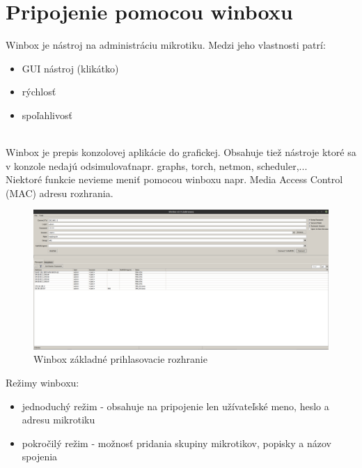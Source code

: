 \section{Pripojenie pomocou winboxu}
Winbox\cite{winbox} je nástroj na administráciu mikrotiku. Medzi jeho vlastnosti patrí:\begin{itemize}
\item GUI nástroj (klikátko)
\item rýchlosť
\item spoľahlivosť 
\end{itemize} 
\\Winbox je prepis konzolovej aplikácie do grafickej. Obsahuje tiež nástroje ktoré sa v konzole nedajú odsimulovaťnapr. graphs, torch, netmon, scheduler,...\\
Niektoré funkcie nevieme meniť pomocou winboxu napr. Media Access Control (MAC) adresu rozhrania. 
\begin{figure}[H]
\centering
\includegraphics[scale=0.2]{../text/winbox.png}
\caption{Winbox základné prihlasovacie rozhranie}
\label{fig:winbox}
\end{figure} 
Režimy winboxu:\begin{itemize}
\item jednoduchý režim - obsahuje na pripojenie len užívateľské meno, heslo a adresu mikrotiku
\item pokročilý režim - možnosť pridania skupiny mikrotikov, popisky a názov spojenia
\end{itemize}

